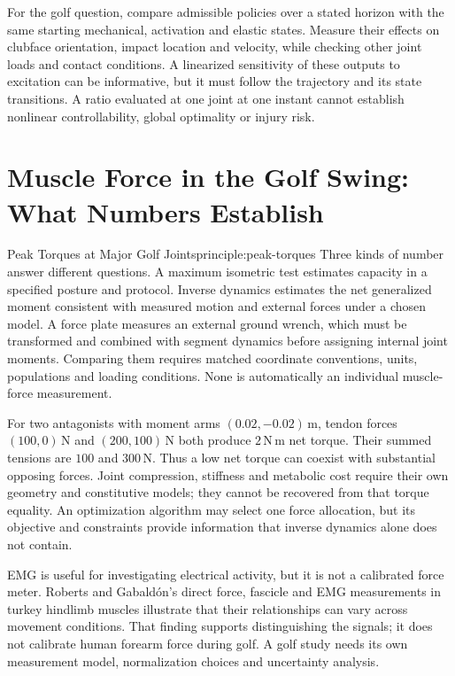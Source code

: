 For the golf question, compare admissible policies over a stated horizon with the same starting mechanical, activation and elastic states. Measure their effects on clubface orientation, impact location and velocity, while checking other joint loads and contact conditions. A linearized sensitivity of these outputs to excitation can be informative, but it must follow the trajectory and its state transitions. A ratio evaluated at one joint at one instant cannot establish nonlinear controllability, global optimality or injury risk.

\section{Muscle Force in the Golf Swing: What Numbers Establish}

\begin{principle}{Peak Torques at Major Golf Joints}{principle:peak-torques}
Three kinds of number answer different questions. A maximum isometric test estimates capacity in a specified posture and protocol. Inverse dynamics estimates the net generalized moment consistent with measured motion and external forces under a chosen model. A force plate measures an external ground wrench, which must be transformed and combined with segment dynamics before assigning internal joint moments. Comparing them requires matched coordinate conventions, units, populations and loading conditions. None is automatically an individual muscle-force measurement.
\end{principle}

For two antagonists with moment arms $(0.02,-0.02)\,\mathrm{m}$, tendon forces $(100,0)\,\mathrm{N}$ and $(200,100)\,\mathrm{N}$ both produce $2\,\mathrm{N\,m}$ net torque. Their summed tensions are $100$ and $300\,\mathrm{N}$. Thus a low net torque can coexist with substantial opposing forces. Joint compression, stiffness and metabolic cost require their own geometry and constitutive models; they cannot be recovered from that torque equality. An optimization algorithm may select one force allocation, but its objective and constraints provide information that inverse dynamics alone does not contain.

EMG is useful for investigating electrical activity, but it is not a calibrated force meter. Roberts and Gabaldón's direct force, fascicle and EMG measurements in turkey hindlimb muscles illustrate that their relationships can vary across movement conditions. That finding supports distinguishing the signals; it does not calibrate human forearm force during golf. \citep{RobertsGabaldon2008EMG} A golf study needs its own measurement model, normalization choices and uncertainty analysis.

